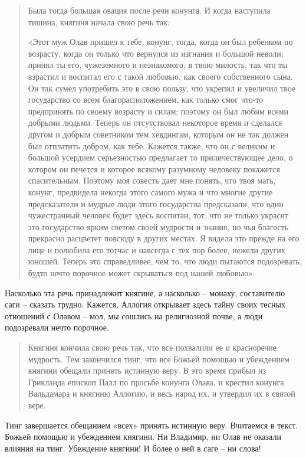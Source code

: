 \begin{quotation}
Была тогда большая овация после речи конунга. И когда наступила тишина, княгиня начала свою речь так: 

«Этот муж Олав пришел к тебе, конунг, тогда, когда он был ребенком по возрасту, когда он только что вернулся из изгнания и большой неволи; принял ты его, чужеземного и незнакомого, в твою милость, так что ты взрастил и воспитал его с такой любовью, как своего собственного сына. Он так сумел употребить это в свою пользу, что укрепил и увеличил твое государство со всем благорасположением, как только смог что-то предпринять по своему возрасту и силам; поэтому он был любим всеми добрыми людьми. Теперь он отсутствовал некоторое время и сделался другом и добрым советником тем хёвдингам, которым он не так должен был отплатить добром, как тебе. Кажется также, что он с великим и большой усердием серьезностью предлагает то приличествующее дело, о котором он печется и которое всякому разумному человеку покажется спасительным. Поэтому моя совесть дает мне понять, что твоя мать, конунг, предвидела некогда этого самого мужа и что многие другие предсказатели и мудрые люди этого государства предсказали, что один чужестранный человек будет здесь воспитан, тот, что не только украсит это государство ярким светом своей мудрости и знания, но чья благость прекрасно расцветет повсюду в других местах. Я видела это прежде на его лице и полюбила его тотчас и навсегда с тех пор более, нежели других юношей. Теперь это справедливее, чем то, что люди пытаются подозревать, будто нечто порочное может скрываться под нашей любовью».
\end{quotation}

Насколько эта речь принадлежит княгине, а насколько – монаху, составителю саги – сказать трудно. Кажется, Аллогия открывает здесь тайну своих тесных отношений с Олавом – мол, мы сошлись на религиозной почве, а люди подозревали нечто порочное.

\begin{quotation}
Княгиня кончила свою речь так, что все похвалили ее и красноречие мудрость. Тем закончился тинг, что все Божьей помощью и убеждением княгини обещали принять истинную веру. В это время прибыл из Грикланда епископ Палл по просьбе конунга Олава, и крестил конунга Вальдамара и княгиню Аллогию, и весь народ их, и утвердил их в святой вере.
\end{quotation}

Тинг завершается обещанием «всех» принять истинную веру. Вчитаемся в текст. Божьей помощью и убеждением княгини. Ни Владимир, ни Олав не оказали влияния на тинг. Убеждение княгини! И более о ней в саге – ни слова!

